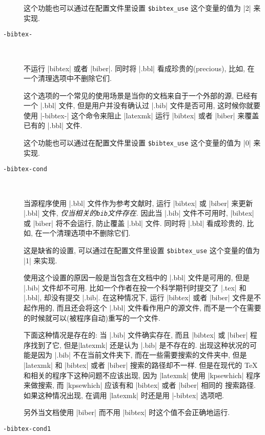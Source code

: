 \documentclass{ctexart}
\begin{document}
\begin{description}
        这个功能也可以通过在配置文件里设置 \verb|$bibtex_use| 这个变量的值为 |2| 来实现.

        \item[\texttt{-bibtex-}]~
        
        不运行 |bibtex| 或者 |biber|. 同时将 |.bbl| 看成珍贵的(precious), 比如, 在一个清理选项中不删除它们.
        
        这个选项的一个常见的使用场景是当你的文档来自于一个外部的源, 已经有一个 |.bbl| 文件, 但是用户并没有确认过 |.bib| 文件是否可用, 这时候你就要使用 |-bibtex-| 这个命令来阻止 |latexmk| 运行 |bibtex| 或者 |biber| 来覆盖已有的 |.bbl| 文件.

        这个功能也可以通过在配置文件里设置 \verb|$bibtex_use| 这个变量的值为 |0| 来实现.

        \item[\texttt{-bibtex-cond}]~
        
        当源程序使用 |.bbl| 文件作为参考文献时, 运行 |bibtex| 或 |biber| 来更新 |.bbl| 文件, \emph{仅当相关的\texttt{bib}文件存在}. 因此当 |.bib| 文件不可用时, |bibtex| 或 |biber| 将不会运行, 防止覆盖 |.bbl| 文件. 同时将 |.bbl| 看成珍贵的, 比如, 在一个清理选项中不删除它们.

        这是缺省的设置, 可以通过在配置文件里设置 \verb|$bibtex_use| 这个变量的值为 |1| 来实现.

        使用这个设置的原因一般是当包含在文档中的 |.bbl| 文件是可用的, 但是 |.bib| 文件却不可用. 比如一个作者在投一个科学期刊时提交了 |.tex| 和 |.bbl|, 却没有提交 |.bib|. 在这种情况下, 运行 |bibtex| 或者 |biber| 文件是不起作用的, 而且还会将这个 |.bbl| 文件看作用户的源文件, 而不是一个在需要的时候就可以(被程序自动)重写的一个文件.

        \begin{Remark}
            下面这种情况是存在的: 当 |.bib| 文件确实存在, 而且 |bibtex| 或 |biber| 程序找到了它, 但是|latexmk| 还是认为 |.bib| 是不存在的. 出现这种状况的可能是因为 |.bib| 不在当前文件夹下, 而在一些需要搜索的文件夹中, 但是 |latexmk| 和 |bibtex| 或者 |biber| 搜索的路径却不一样. 但是在现代的 \TeX 和相关的程序下这种问题不应该出现, 因为 |latexmk| 使用 |kpsewhich| 程序来做搜索, 而 |kpsewhich| 应该有和 |bibtex| 或者 |biber| 相同的 搜索路径. 如果这种情况出现, 在调用 |latexmk| 时还是用 |-bibtex| 选项吧.
        \end{Remark}

        另外当文档使用 |biber| 而不用 |bibtex| 时这个值不会正确地运行. 

        \item[\texttt{-bibtex-cond1}]~
        

\end{description}
\end{document}
